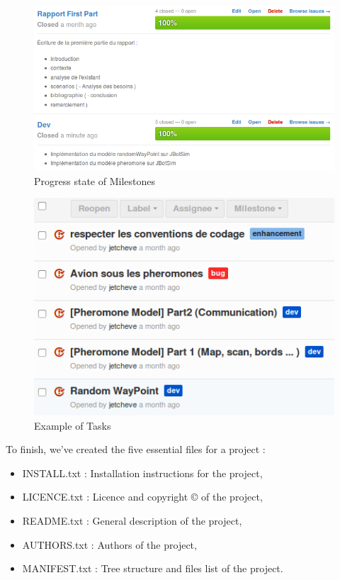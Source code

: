 \begin{figure}[!h]
\caption{\label{Milestones}Progress state of Milestones}
   \includegraphics[scale=0.7]{../images/Milestones.png}
\end{figure}

\begin{figure}[!h]
\caption{\label{Tasks}Example of Tasks}
   \includegraphics[scale=0.7]{../images/tasks.png}
\end{figure}


To finish, we've created the five essential files for a project :

\begin{itemize}
\item INSTALL.txt  : Installation instructions for the project,
\item LICENCE.txt  : Licence and copyright \copyright{} of the project,
\item README.txt   : General description of the project,
\item AUTHORS.txt  : Authors of the project,
\item MANIFEST.txt : Tree structure and files list of the project.
\end{itemize}

